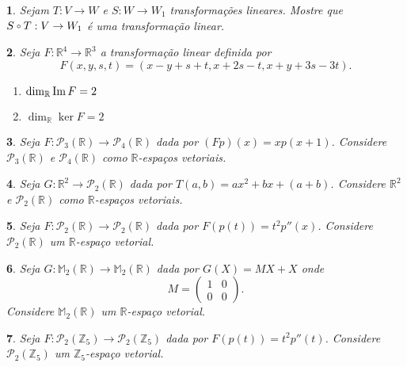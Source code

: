 \documentclass[12pt]{exam}
\newtheorem{exercicio}{}
\newcommand{\im}{{\rm Im\,}}
\newcommand{\z}{\mathbb{Z}}
\newcommand{\real}{\mathbb{R}}
\newcommand{\cp}[1]{\mathbb{#1}}
\newcommand{\compcent}[1]{\vcenter{\hbox{$#1\circ$}}}
\newcommand{\comp}{\mathbin{\mathchoice
{\compcent\scriptstyle}{\compcent\scriptstyle}
{\compcent\scriptscriptstyle}{\compcent\scriptscriptstyle}}}
\begin{document}
\begin{exercicio}
  Sejam $T : V \to W$ e $S : W \to W_1$ transforma\c{c}\~oes lineares. Mostre que $S \comp T : V \to W_1$ \'e uma transforma\c{c}\~ao linear.
\end{exercicio}


\begin{exercicio}\label{nucleo_imagem_inicio}
  Seja $F : \real^4 \to \real^3$ a transforma\c{c}\~ao linear definida por
  \[
    F(x,y,s,t) = (x - y + s + t, x + 2s - t, x + y + 3s - 3t).
  \]
  \begin{solucao}
    \begin{enumerate}[label=({\alph*})]
      \item $\dim_\real\im F = 2$
      \item $\dim_\real\ker F = 2$
    \end{enumerate}
  \end{solucao}
\end{exercicio}

\begin{exercicio}
Seja $F : \mathcal{P}_3(\real) \to \mathcal{P}_4(\real)$ dada por $(Fp)(x) = xp(x + 1)$. Considere $\mathcal{P}_3(\real)$ e $\mathcal{P}_4(\real)$ como $\real$-espa\c{c}os vetoriais.
\end{exercicio}

\begin{exercicio}
  Seja $G : \real^2 \to \mathcal{P}_2(\real)$ dada por $T(a,b) = ax^2 + bx + (a + b)$. Considere $\real^2$ e $\mathcal{P}_2(\real)$ como $\real$-espa\c{c}os vetoriais.
\end{exercicio}

\begin{exercicio}
  Seja $F : \mathcal{P}_2(\real) \to \mathcal{P}_2(\real)$ dada por $F(p(t)) = t^2p''(x)$. Considere $\mathcal{P}_2(\real)$ um $\real$-espa\c{c}o vetorial.
\end{exercicio}

\begin{exercicio}
  Seja $G : \cp{M}_2(\real) \to \cp{M}_2(\real)$ dada por $G(X) = MX + X$ onde
    \[
      M = \begin{pmatrix}
        1 & 0\\
        0 & 0
      \end{pmatrix}.
    \]
    Considere $\cp{M}_2(\real)$ um $\real$-espa\c{c}o vetorial.
\end{exercicio}


\begin{exercicio}
  Seja $F : \mathcal{P}_2(\z_5) \to \mathcal{P}_2(\z_5)$ dada por $F(p(t)) = t^2p''(t)$. Considere $\mathcal{P}_2(\z_5)$ um $\z_5$-espa\c{c}o vetorial.
\end{exercicio}
\end{document}
